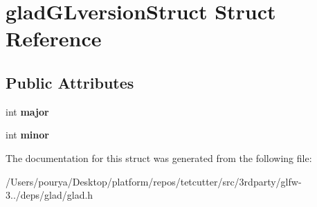 \hypertarget{structgladGLversionStruct}{}\section{glad\+G\+Lversion\+Struct Struct Reference}
\label{structgladGLversionStruct}
\subsection*{Public Attributes}
\begin{DoxyCompactItemize}
\item 
\hypertarget{structgladGLversionStruct_ac7f9db11d2679df12ef0313b728554db}{}int {\bfseries major}\label{structgladGLversionStruct_ac7f9db11d2679df12ef0313b728554db}

\item 
\hypertarget{structgladGLversionStruct_acc2bff1c8966c6866f2ad6f5a4e475b2}{}int {\bfseries minor}\label{structgladGLversionStruct_acc2bff1c8966c6866f2ad6f5a4e475b2}

\end{DoxyCompactItemize}


The documentation for this struct was generated from the following file\+:\begin{DoxyCompactItemize}
\item 
/\+Users/pourya/\+Desktop/platform/repos/tetcutter/src/3rdparty/glfw-\/3../deps/glad/glad.\+h\end{DoxyCompactItemize}
